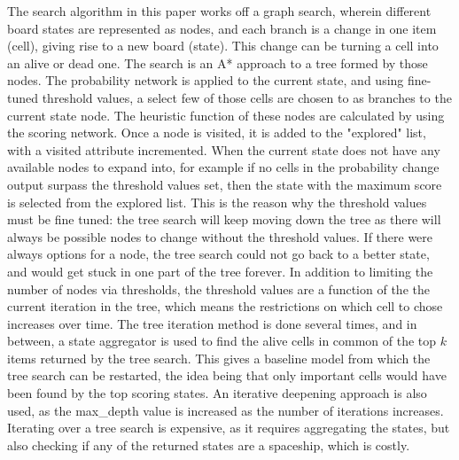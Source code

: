 \documentclass{l4proj}
\begin{document}
The search algorithm in this paper works off a graph search, wherein different board states are represented as nodes, and each branch is a change in one item (cell), giving rise to a new board (state). This change can be turning a cell into an alive or dead one. The search is an A* approach to a tree formed by those nodes. The probability network is applied to the current state, and using fine-tuned threshold values, a select few of those cells are chosen to as branches to the current state node. The heuristic function of these nodes are calculated by using the scoring network. Once a node is visited, it is added to the "explored" list, with a visited attribute incremented. When the current state does not have any available nodes to expand into, for example if no cells in the probability change output surpass the threshold values set, then the state with the maximum score is selected from the explored list. This is the reason why the threshold values must be fine tuned: the tree search will keep moving down the tree as there will always be possible nodes to change without the threshold values. If there were always options for a node, the tree search could not go back to a better state, and would get stuck in one part of the tree forever. In addition to limiting the number of nodes via thresholds, the threshold values are a function of the the current iteration in the tree, which means the restrictions on which cell to chose increases over time. The tree iteration method is done several times, and in between, a state aggregator is used to find the alive cells in common of the top $k$ items returned by the tree search. This gives a baseline model from which the tree search can be restarted, the idea being that only important cells would have been found by the top scoring states. An iterative deepening approach is also used, as the max\_depth value is increased as the number of iterations increases. Iterating over a tree search is expensive, as it requires aggregating the states, but also checking if any of the returned states are a spaceship, which is costly.
\end{document}
